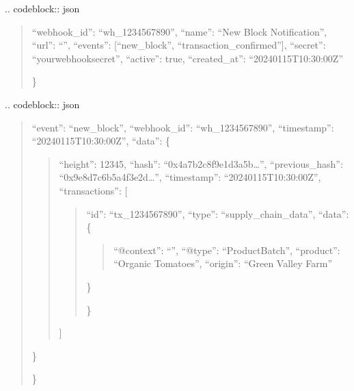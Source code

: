\documentclass[letterpaper,10pt,english]{sphinxmanual}
\begin{document}
\sphinxAtStartPar
{}
.. code\sphinxhyphen{}block:: json
\begin{quote}
\begin{description}
\sphinxlineitem{\{}
\sphinxAtStartPar
“webhook\_id”: “wh\_1234567890”,
“name”: “New Block Notification”,
“url”: “”,
“events”: {[}“new\_block”, “transaction\_confirmed”{]},
“secret”: “your\sphinxhyphen{}webhook\sphinxhyphen{}secret”,
“active”: true,
“created\_at”: “2024\sphinxhyphen{}01\sphinxhyphen{}15T10:30:00Z”

\end{description}

\sphinxAtStartPar
\}
\end{quote}

\sphinxAtStartPar
{}
.. code\sphinxhyphen{}block:: json
\begin{quote}
\begin{description}
\sphinxlineitem{\{}
\sphinxAtStartPar
“event”: “new\_block”,
“webhook\_id”: “wh\_1234567890”,
“timestamp”: “2024\sphinxhyphen{}01\sphinxhyphen{}15T10:30:00Z”,
“data”: \{
\begin{quote}

\sphinxAtStartPar
“height”: 12345,
“hash”: “0x4a7b2c8f9e1d3a5b…”,
“previous\_hash”: “0x9e8d7c6b5a4f3e2d…”,
“timestamp”: “2024\sphinxhyphen{}01\sphinxhyphen{}15T10:30:00Z”,
“transactions”: {[}
\begin{quote}
\begin{description}
\sphinxlineitem{\{}
\sphinxAtStartPar
“id”: “tx\_1234567890”,
“type”: “supply\_chain\_data”,
“data”: \{
\begin{quote}

\sphinxAtStartPar
“@context”: “”,
“@type”: “ProductBatch”,
“product”: “Organic Tomatoes”,
“origin”: “Green Valley Farm”
\end{quote}

\sphinxAtStartPar
\}

\end{description}

\sphinxAtStartPar
\}
\end{quote}

\sphinxAtStartPar
{]}
\end{quote}

\sphinxAtStartPar
\}

\end{description}

\sphinxAtStartPar
\}
\end{quote}
\end{document}
